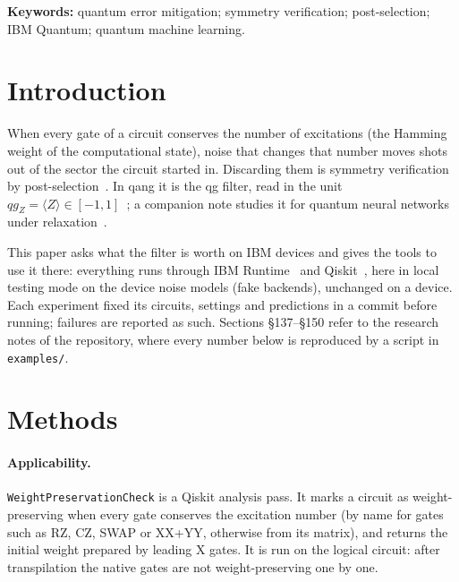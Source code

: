 \documentclass[11pt]{article}
\newcommand{\qZ}{qg_Z}
\begin{document}
\begin{abstract}
(1.84). With two or three interacting excitations (XXZ chain) the gain falls from 5.6$\times$ to
2.6$\times$: larger sectors let more of the noise through. Estimating the fidelity of two states, the filter cuts the
error of a weight-preserving inversion test 3.8--11.2$\times$ but that of the swap test only 1.4--1.8$\times$,
because the swap test's answer is on an ancilla outside the symmetry. Coherent ZZ errors, which conserve the
weight, are still partly filtered (32--60\% of the added error for always-on ZZ crosstalk), because they act
partly inside native gate decompositions.
Two interoperability bugs were found, one in qiskit-machine-learning and one in the library. All results are
on device noise models; no hardware run is reported.
\end{abstract}

\noindent\textbf{Keywords:} quantum error mitigation; symmetry verification; post-selection; IBM Quantum;
quantum machine learning.

\section{Introduction}

When every gate of a circuit conserves the number of excitations (the Hamming weight of the computational
state), noise that changes that number moves shots out of the sector the circuit started in. Discarding
them is symmetry verification by post-selection~\cite{bonetmonroig2018,mcardle2019}. In qang it is the qg
filter, read in the unit $\qZ=\langle Z\rangle\in[-1,1]$~\cite{monteverde2026qang}; a companion note studies
it for quantum neural networks under relaxation~\cite{monteverde2026qml}.

This paper asks what the filter is worth on IBM devices and gives the tools to use it there: everything
runs through IBM Runtime~\cite{qiskitibmruntime} and Qiskit~\cite{javadiabhari2024qiskit}, here in local
testing mode on the device noise models (fake backends), unchanged on a device. Each experiment fixed its
circuits, settings and predictions in a commit before running; failures are reported as such. Sections
§137--§150 refer to the research notes of the repository, where every number below is reproduced by a
script in \texttt{examples/}.

\section{Methods}

\paragraph{Applicability.} \texttt{WeightPreservationCheck} is a Qiskit analysis pass. It marks a circuit as
weight-preserving when every gate conserves the excitation number (by name for gates such as RZ, CZ, SWAP or
XX+YY, otherwise from its matrix), and returns the initial weight prepared by leading X gates. It is run on
the logical circuit: after transpilation the native gates are not weight-preserving one by one.
\end{document}
